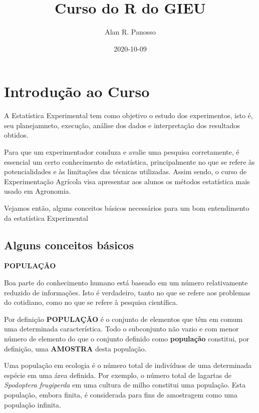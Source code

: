 \documentclass[
]{book}
\title{Curso do R do GIEU}
\author{Alan R. Panosso}
\date{2020-10-09}
\begin{document}
\maketitle

{
\setcounter{tocdepth}{1}
\tableofcontents
}
\hypertarget{introduuxe7uxe3o-ao-curso}{%
\chapter{Introdução ao Curso}\label{introduuxe7uxe3o-ao-curso}}

A Estatística Experimental tem como objetivo o estudo dos experimentos, isto é, seu planejamneto, execução, análise dos dados e interpretação dos resultados obtidos.

Para que um experimentador conduza e avalie uma pesquisa corretamente, é essencial um certo conhecimento de estatística, principalmente no que se refere às potencialidades e às limitações das técnicas utilizadas. Assim sendo, o curso de Experimentação Agrícola visa apresentar aos alunos os métodos estatística mais usado em Agronomia.

Vejamos então, alguns conceitos básicos necessários para um bom entendimento da estatística Experimental

\hypertarget{alguns-conceitos-buxe1sicos}{%
\section{Alguns conceitos básicos}\label{alguns-conceitos-buxe1sicos}}

\textbf{POPULAÇÃO}

Boa parte do conhecimento humano está baseado em um número relativamente reduzido de informações. Isto é verdadeiro, tanto no que se refere aos problemas do cotidiano, como no que se refere à pesquisa científica.

Por definição \textbf{POPULAÇÃO} é o conjunto de elementos que têm em comum uma determinada característica. Todo o subconjunto não vazio e com menor número de elemento do que o conjunto definido como \textbf{população} constitui, por definição, uma \textbf{AMOSTRA} desta população.

Uma população em ecologia é o número total de indivíduos de uma determinada espécie em uma área definida. Por exemplo, o número total de lagartas de \emph{Spodoptera frugiperda} em uma cultura de milho constitui uma população. Esta população, embora finita, é considerada para fins de amostragem como uma população infinita.
\end{document}
